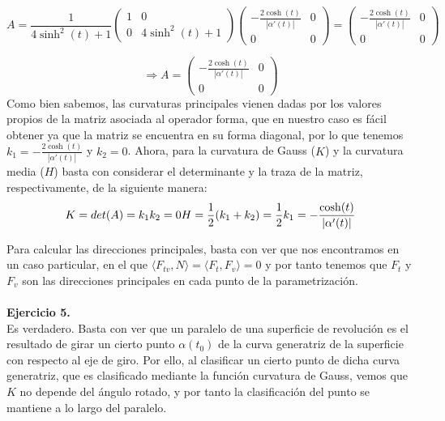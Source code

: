 \documentclass[fleqn]{article}
\begin{document}
    \begin{equation*}
        A = \frac{1}{4\sinh^2(t) +1}
        \begin{pmatrix}
            1 & 0\\
            0 & 4\sinh^2(t) +1
        \end{pmatrix}
        \begin{pmatrix}
            -\frac{2\cosh(t)}{|\alpha'(t)|} & 0 \\
            0 & 0
        \end{pmatrix} = 
        \begin{pmatrix}
            -\frac{2\cosh(t)}{|\alpha'(t)|} & 0 \\
            0 & 0
        \end{pmatrix}
    \end{equation*}

    $$\Rightarrow A =
    \begin{pmatrix}
        -\frac{2\cosh(t)}{|\alpha'(t)|} & 0 \\
        0 & 0
    \end{pmatrix}
    $$
    Como bien sabemos, las curvaturas principales vienen dadas por los valores propios de la matriz asociada al operador forma, que en nuestro caso es fácil obtener 
    ya que la matriz se encuentra en su forma diagonal, por lo que tenemos $k_1 = -\frac{2\cosh(t)}{|\alpha'(t)|} $ y $k_2 = 0$. Ahora, para la curvatura de Gauss ($K$) y la curvatura
    media ($H$) basta con considerar el determinante y la traza de la matriz, respectivamente, de la siguiente manera:
    \begin{equation*}
        K = det(A) = k_1 k_2 = 0 \\
        H = \frac{1}{2}(k_1 + k_2) = \frac{1}{2}k_1 = -\frac{\cosh(t)}{|\alpha'(t)|}
    \end{equation*} 

    Para calcular las direcciones principales, basta con ver que nos encontramos en un caso particular, en el que $\langle F_{tv}, N \rangle = \langle F_{t}, F_v \rangle = 0$
    y por tanto tenemos que $F_t$ y $F_v$ son las direcciones principales en cada punto de la parametrización.\\ \\

    \textbf{Ejercicio 5. } \\

    Es verdadero. Basta con ver que un paralelo de una superficie de revolución es el resultado de girar un cierto punto $\alpha(t_0)$ de la curva generatriz de la superficie con respecto
    al eje de giro. Por ello, al clasificar un cierto punto de dicha curva generatriz, que es clasificado mediante la función curvatura de Gauss, vemos que $K$ no depende del ángulo rotado,
    y por tanto la clasificación del punto se mantiene a lo largo del paralelo. 
    
\end{document}
